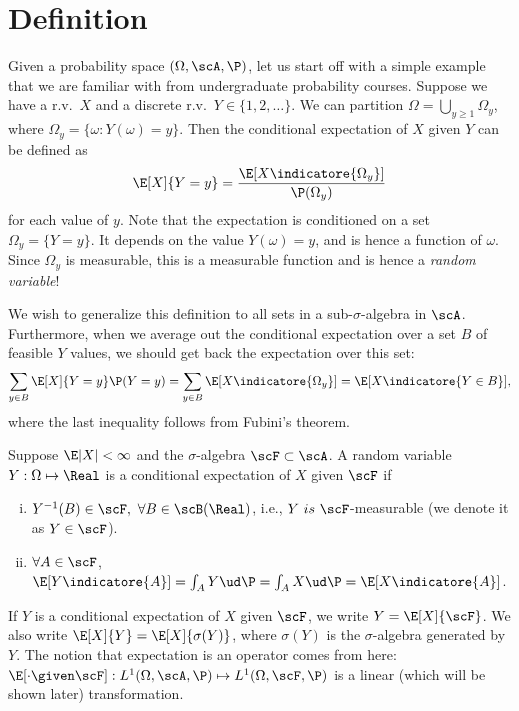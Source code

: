 \documentclass[../aipt.tex]{subfiles}
\begin{document}

\section{Definition}
Given a probability space $(\Omega,\scA,\P)$, let us start off with a simple example that we are familiar with from undergraduate probability courses. Suppose we have a r.v.\ $X$ and a discrete r.v.\ $Y \in \{1,2,\ldots\}$. We can partition $\Omega = \bigcup_{y \geq 1 } \Omega_y$, where $\Omega_y = \{ \omega: Y(\omega)=y\}$.  Then the conditional expectation of $X$ given $Y$ can be defined as
\begin{align*}
\E[X]{Y=y} = \frac{\E[X\indicatore{\Omega_y}]}{\P (\Omega_y)}
\end{align*}
for each value of $y$. Note that the expectation is conditioned on a set $\Omega_y=\{Y=y\}$. It depends on the value $Y(\omega)=y$, and is hence a function of $\omega$. Since $\Omega_y$ is measurable, this is a measurable function and is hence a \emph{random variable}! 

We wish to generalize this definition to all sets in a sub-$\sigma$-algebra in $\scA$. Furthermore, when we average out the conditional expectation over a set $B$ of feasible $Y$ values, we should get back the expectation over this set:
\begin{align*}
\sum_{y\in B} \E[X]{Y=y} \P(Y=y) = \sum_{y\in B} \E[X\indicatore{\Omega_y}] = \E[X\indicatore{Y\in B}],
\end{align*}
where the last inequality follows from Fubini's theorem.
	
\begin{Definition}\label{wk12:expectation}
Suppose $\E |X|<\infty$ and the $\sigma$-algebra $\scF \subset \scA$. A random variable $Y:\Omega \mapsto \Real$ is a conditional expectation of $X$ given $\scF$ if
\begin{enumerate}[(i)]
\item $Y^{-1}(B)\in \scF, \ \forall B \in \scB(\Real)$, i.e., $Y\ is\ \scF$-measurable (we denote it as $Y\in\scF$).
\item $\forall A \in \scF$, $\E[Y\indicatore{A}] = \int_{A} Y \ud \P=\int _A X \ud \P = \E[X\indicatore{A}]$.
\end{enumerate}
\end{Definition}
If $Y$ is a conditional expectation of $X$ given $\scF$, we write $Y = \E[X]{\scF}$. We also write $\E[X]{Y}=\E[X]{\sigma(Y)}$, where $\sigma(Y)$ is the $\sigma$-algebra generated by $Y$. The notion that expectation is an operator comes from here: $\E[{\cdot} \given \scF] : L^1(\Omega,\scA,\P) \mapsto L^1(\Omega,\scF,\P)$ is a linear (which will be shown later) transformation.
\end{document}

